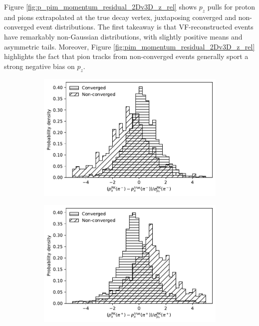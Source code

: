 Figure \ref{fig:p_pim_momentum_residual_2Dv3D_z_rel} shows $p_z$ pulls for proton and pions extrapolated at the \lz true decay vertex, juxtaposing converged and non-converged event distributions.
The first takeaway is that VF-reconstructed events have remarkably non-Gaussian distributions, with slightly positive means and asymmetric tails. 
Moreover, Figure \ref{fig:pim_momentum_residual_2Dv3D_z_rel} highlights the fact that pion tracks from non-converged events generally sport a strong negative bias on $p_z$.

\begin{figure}[t]
	\centering
	\begin{subfigure}{.45\textwidth}
		\includegraphics[width=\textwidth]{graphics/03-vertex_reconstruction/NONCONVERGED_pim_momentum_residual_2Dv3D_x_rel_matter.pdf}
		\caption{}
		\label{fig:pim_momentum_residual_2Dv3D_x_rel_matter}
	\end{subfigure}
	\begin{subfigure}{.45\textwidth}
		\includegraphics[width=\textwidth]{graphics/03-vertex_reconstruction/NONCONVERGED_pim_momentum_residual_2Dv3D_x_rel_antimatter.pdf}

\end{subfigure}
\end{figure}
